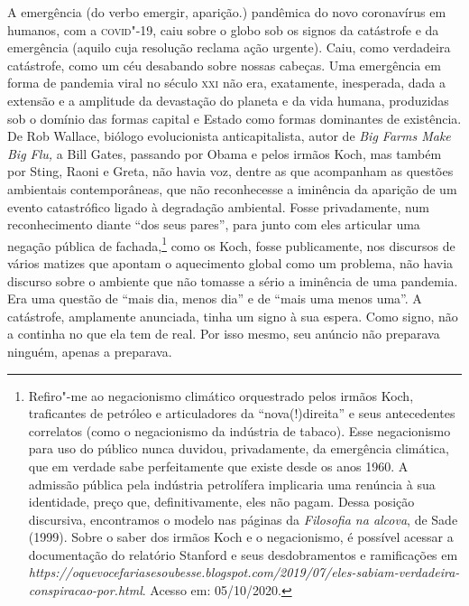 \noindent{}A emergência (do verbo emergir, aparição.) pandêmica do novo coronavírus
em humanos, com a \textsc{covid}"-19, caiu sobre o globo sob os signos da
catástrofe e da emergência (aquilo cuja resolução reclama ação urgente).
Caiu, como verdadeira catástrofe, como um céu desabando sobre nossas
cabeças. Uma emergência em forma de pandemia viral no século \textsc{xxi} não
era, exatamente, inesperada, dada a extensão e a amplitude da devastação
do planeta e da vida humana, produzidas sob o domínio das formas capital
e Estado como formas dominantes de existência. De Rob Wallace, biólogo
evolucionista anticapitalista, autor de \emph{Big Farms Make Big Flu,} a
Bill Gates, passando por Obama e pelos irmãos Koch, mas também por
Sting, Raoni e Greta, não havia voz, dentre as que acompanham as
questões ambientais contemporâneas, que não reconhecesse a iminência da
aparição de um evento catastrófico ligado à degradação ambiental. Fosse
privadamente, num reconhecimento diante ``dos seus pares'', para junto
com eles articular uma negação pública de fachada,\footnote{Refiro"-me ao
  negacionismo climático orquestrado pelos irmãos Koch, traficantes de
  petróleo e articuladores da ``nova(!)direita'' e seus antecedentes
  correlatos (como o negacionismo da indústria de tabaco). Esse
  negacionismo para uso do público nunca duvidou, privadamente, da
  emergência climática, que em verdade sabe perfeitamente que existe
  desde os anos 1960. A admissão pública pela indústria petrolífera
  implicaria uma renúncia à sua identidade, preço que, definitivamente,
  eles não pagam. Dessa posição discursiva, encontramos o modelo nas
  páginas da \emph{Filosofia na alcova}, de Sade (1999). Sobre o saber
  dos irmãos Koch e o negacionismo, é possível acessar a documentação do
  relatório Stanford e seus desdobramentos e ramificações em
  \emph{https://oquevocefariasesoubesse.blogspot.com/2019/07/eles-sabiam-verdadeira-conspiracao-por.html}.
  Acesso em: 05/10/2020.} como os Koch, fosse publicamente, nos
discursos de vários matizes que apontam o aquecimento global como um
problema, não havia discurso sobre o ambiente que não tomasse a sério a
iminência de uma pandemia. Era uma questão de ``mais dia, menos dia'' e
de ``mais uma menos uma''. A catástrofe, amplamente anunciada, tinha um
signo à sua espera. Como signo, não a continha no que ela tem de real.
Por isso mesmo, seu anúncio não preparava ninguém, apenas a preparava.

